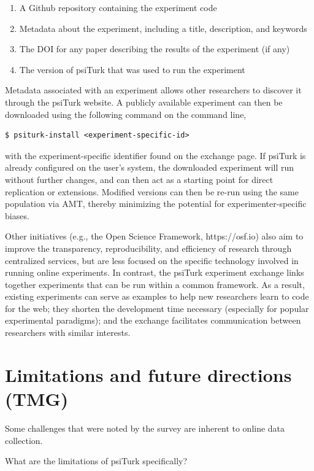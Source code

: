 \documentclass[twocolumn]{svjour3}          %
\begin{document}
\begin{enumerate}
\item A Github repository containing the experiment code
\item Metadata about the experiment, including a title, description, and keywords
\item The DOI for any paper describing the results of the experiment (if any)
\item The version of psiTurk that was used to run the experiment
\end{enumerate}


Metadata associated with an experiment allows other researchers to discover it through the psiTurk website.
A publicly available experiment can then be downloaded using the following command on the command line,

\begin{lstlisting}
$ psiturk-install <experiment-specific-id>
\end{lstlisting}

\noindent with the experiment-specific identifier found on the exchange page.
If psiTurk is already configured on the user's system, the downloaded experiment will run without further changes, and can then act as a starting point for direct replication or extensions.
Modified versions can then be re-run using the same population via AMT, thereby minimizing the potential for experimenter-specific biases.

Other initiatives (e.g., the Open Science Framework, https://osf.io) also aim to improve the transparency, reproducibility, and efficiency of research through centralized services, but are less focused on the specific technology involved in running online experiments.
In contrast, the psiTurk experiment exchange links together experiments that can be run within a common framework.
As a result, existing experiments can serve as examples to help new researchers learn to code for the web; they shorten the development time necessary (especially for popular experimental paradigms); and the exchange facilitates communication between researchers with similar interests.

\section{Limitations and future directions (TMG)}

Some challenges that were noted by the survey are inherent to online data collection.

What are the limitations of psiTurk specifically?
\end{document}
